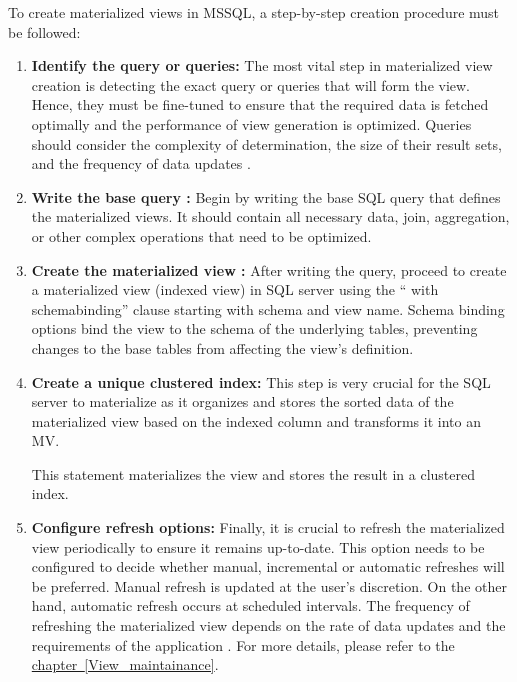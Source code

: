  To create materialized views in MSSQL, a step-by-step creation procedure must be followed:
 \begin{enumerate}
     

     \item\textbf{Identify the query or queries:} The most vital step in materialized view creation is detecting the exact query or queries that will form the view. Hence, they must be fine-tuned to ensure that the required data is fetched optimally and the performance of view generation is optimized. Queries should consider the complexity of determination, the size of their result sets, and the frequency of data updates \cite{castordoc2023}.
     
      \item\textbf{ Write the base query :} Begin by writing the base  SQL query that defines the materialized views. It should contain all necessary data, join, aggregation, or other complex operations that need to be optimized. \vspace{0.4cm}
      
      
      \item\textbf{ Create the materialized view :} After writing the query, proceed to create a materialized view (indexed view) in SQL server using the `` with schemabinding'' clause starting with schema and view name. Schema binding options bind the view to the schema of the underlying tables, preventing changes to the base tables from affecting the view's definition. %

      

      \item\textbf{ Create a unique clustered index:} This step is very crucial for the SQL server to materialize as it organizes and stores the sorted data of the materialized view based on the indexed column and transforms it into an MV. \vspace{0.4cm}
      
       

This statement materializes the view and stores the result in a clustered index.
      
      \item\textbf{ Configure refresh options:} Finally, it is crucial to refresh the materialized view periodically to ensure it remains up-to-date. This option needs to be configured to decide whether manual, incremental or automatic refreshes will be preferred. Manual refresh is updated at the user's discretion. On the other hand, automatic refresh occurs at scheduled intervals. The frequency of refreshing the materialized view depends on the rate of data updates and the requirements of the application \cite{castordoc2023}. For more details, please refer to the \hyperref[View_maintainance]{chapter~\ref*{View_maintainance}}.\vspace{0.4cm}
      

\end{enumerate}

